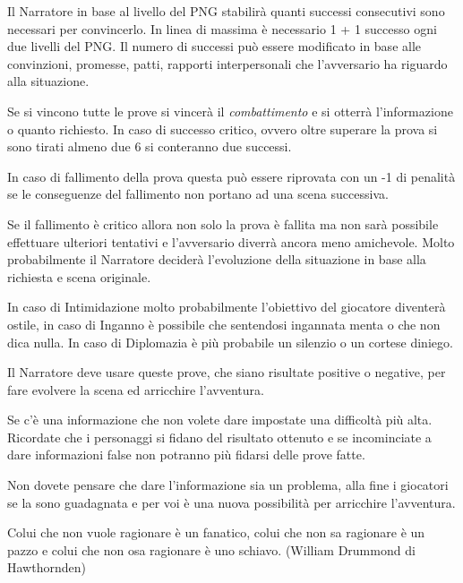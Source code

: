 \begin{multicols}{2}
Il Narratore in base al livello del PNG stabilirà quanti successi consecutivi sono necessari per convincerlo. In linea di massima è necessario 1 + 1 successo ogni due livelli del PNG. Il numero di successi può essere modificato in base alle convinzioni, promesse, patti, rapporti interpersonali che l'avversario ha riguardo alla situazione.

Se si vincono tutte le prove si vincerà il \emph{combattimento} e si otterrà l'informazione o quanto richiesto. In caso di successo critico, ovvero oltre superare la prova si sono tirati almeno due 6 si conteranno due successi.

In caso di fallimento della prova questa può essere riprovata con un -1 di penalità se le conseguenze del fallimento non portano ad una scena successiva.

\begin{figure}

\centering
\end{figure}

Se il fallimento è critico allora non solo la prova è fallita ma non sarà possibile effettuare ulteriori tentativi e l'avversario diverrà ancora meno amichevole. Molto probabilmente il Narratore deciderà l'evoluzione della situazione in base alla richiesta e scena originale.

In caso di Intimidazione molto probabilmente l'obiettivo del giocatore diventerà ostile, in caso di Inganno è possibile che sentendosi ingannata menta o che non dica nulla. In caso di Diplomazia è più probabile un silenzio o un cortese diniego.

Il Narratore deve usare queste prove, che siano risultate positive o negative, per fare evolvere la scena ed arricchire l'avventura.

Se c'è una informazione che non volete dare impostate una difficoltà più alta.
Ricordate che i personaggi si fidano del risultato ottenuto e se incominciate a dare informazioni false non potranno più fidarsi delle prove fatte.

Non dovete pensare che dare l'informazione sia un problema, alla fine i giocatori se la sono guadagnata e per voi è una nuova possibilità per arricchire l'avventura.

\end{multicols}

\vfill

\begin{changemargin}{0.3cm}{0.3cm}\begin{enfasi}{
Colui che non vuole ragionare è un fanatico, colui che non sa ragionare è un pazzo e colui che non osa ragionare è uno schiavo. (William Drummond di Hawthornden)
}\end{enfasi}\end{changemargin}



\pagebreak

